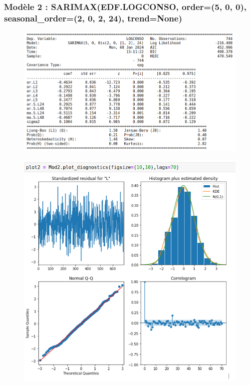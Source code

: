 \documentclass{beamer}
\theoremstyle{definition}
\begin{document}
\begin{frame}
	\frametitle{Modèle 2 : SARIMAX(EDF.LOGCONSO, order=(5, 0, 0), seasonal\_order=(2, 0, 2, 24), trend=None)}
	\begin{minipage}[t]{1\linewidth}
		\centering
		\begin{minipage}[c]{0.55\linewidth}\centering\begin{figure}
				\centering
				\includegraphics[width=1\linewidth]{18.png}	
		\end{figure}\end{minipage}\hfill 
		\begin{minipage}[c]{0.44\linewidth}\centering\begin{figure}
				\begin{center}
					\includegraphics[width=1\linewidth]{19.png}			
				\end{center}
				
		\end{figure}\end{minipage}
	\end{minipage}	
\end{frame}
\end{document}
